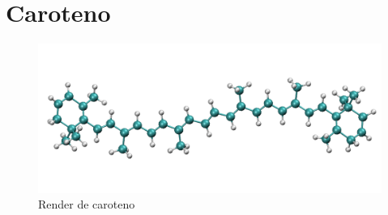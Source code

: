 \section*{Caroteno}
\begin{figure}[htbp]
   \centering
   \includegraphics[width=\plotwidth]{images/caroteno.png}
   \caption{Render de caroteno}
   \label{fig:render-caroteno}
\end{figure}


